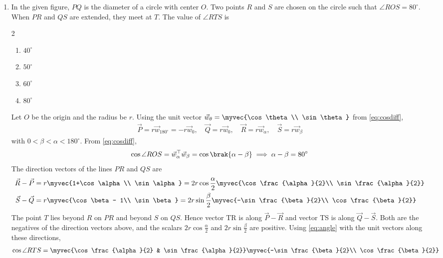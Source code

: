 \begin{enumerate}[label=\thesubsection.\arabic*, ref=\thesubsection.\theenumi, itemsep=0pt, leftmargin=*]
\item In the given figure, $PQ$ is the diameter of a circle with center $O$. Two points $R$ and $S$ are chosen on the circle such that $\angle ROS = 80^\circ$. When $PR$ and $QS$ are extended, they meet at $T$. The value of $\angle RTS$ is \underline{\hspace{2cm}} \gate
\begin{multicols}{2}
\begin{enumerate}[label=\alph*), itemsep=0pt]
\item $40^\circ$
\item $50^\circ$
\item $60^\circ$
\item $80^\circ$
\end{enumerate}
\end{multicols}
\solution Let $O$ be the origin and the radius be $r$. Using the unit vector $\vec{w}_\theta = \myvec{\cos\theta\\ \sin\theta}$ from \eqref{eq:cosdiff},
\begin{align}
\vec{P} = r\vec{w}_{180^\circ} = -r\vec{w}_{0},\quad \vec{Q} = r\vec{w}_{0},\quad \vec{R} = r\vec{w}_\alpha,\quad \vec{S} = r\vec{w}_\beta
\end{align}
with $0 < \beta < \alpha < 180^\circ$. From \eqref{eq:cosdiff},
\begin{align}
\cos\angle ROS = \vec{w}_\alpha^\top\vec{w}_\beta = \cos\brak{\alpha-\beta} \implies \alpha - \beta = 80^\circ
\end{align}
The direction vectors of the lines $PR$ and $QS$ are
\begin{align}
\vec{R} - \vec{P} &= r\myvec{1+\cos\alpha\\ \sin\alpha} = 2r\cos\frac{\alpha}{2}\myvec{\cos\frac{\alpha}{2}\\ \sin\frac{\alpha}{2}}\\
\vec{S} - \vec{Q} &= r\myvec{\cos\beta - 1\\ \sin\beta} = 2r\sin\frac{\beta}{2}\myvec{-\sin\frac{\beta}{2}\\ \cos\frac{\beta}{2}}
\end{align}
The point $T$ lies beyond $R$ on $PR$ and beyond $S$ on $QS$. Hence vector TR is along $\vec{P} - \vec{R}$ and vector TS is along $\vec{Q} - \vec{S}$. Both are the negatives of the direction vectors above, and the scalars $2r\cos\frac{\alpha}{2}$ and $2r\sin\frac{\beta}{2}$ are positive. Using \eqref{eq:angle} with the unit vectors along these directions,
\begin{align}
\cos\angle RTS &= \myvec{\cos\frac{\alpha}{2} & \sin\frac{\alpha}{2}}\myvec{-\sin\frac{\beta}{2}\\ \cos\frac{\beta}{2}}\\

\end{align}
\end{enumerate}
